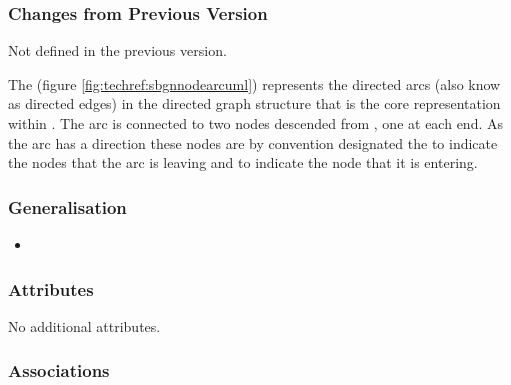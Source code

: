 \begin{valrules}
\end{valrules}


\subsubsection{Changes from Previous Version}

Not defined in the previous version.

\label{defn:SBGNArc}

The  (figure \ref{fig:techref:sbgnnodearcuml}) represents
the directed arcs (also know as directed edges) in the directed graph
structure that is the core representation within \PDl. The arc is
connected to two nodes descended from , one at
each end. As the arc has a direction these nodes are by convention
designated the  to indicate the nodes that the arc
is leaving and  to indicate the node that it is
entering.

\subsubsection{Generalisation}

\begin{itemize}
\item {}
\end{itemize}

\subsubsection{Attributes}

No additional attributes.

\subsubsection{Associations}

